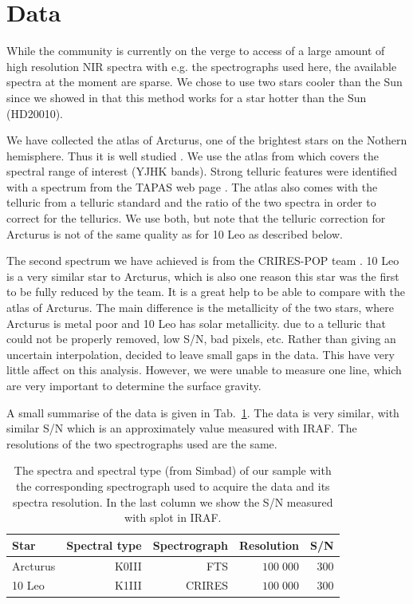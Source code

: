 \documentclass{aa}
\begin{document}
\section{Data}
\label{sec:data}

While the community is currently on the verge to access of a large amount of
high resolution NIR spectra with e.g. the spectrographs used here, the available
spectra at the moment are sparse. We chose to use two stars cooler than the Sun
since we showed in \citet{Andreasen2016} that this method works for a star
hotter than the Sun (HD20010).

We have collected the atlas of Arcturus, one of the brightest stars on the
Nothern hemisphere. Thus it is well studied
\citep[see e.g.][to mention a few]{Griffin1967,McWilliam1990,Ramirez2013}. We
use the atlas from \cite{Hinkle2003} which covers the spectral range of interest
(YJHK bands). Strong telluric features were identified with a spectrum from the
TAPAS web page \citep{Bertaux2014}. The atlas also comes with the telluric from
a telluric standard and the ratio of the two spectra in order to correct for the
tellurics. We use both, but note that the telluric correction for Arcturus is
not of the same quality as for 10 Leo as described below.

The second spectrum we have achieved is from the CRIRES-POP team
\citep{Nicholls2016}. 10 Leo is a very similar star to Arcturus, which is also
one reason this star was the first to be fully reduced by the team. It is a
great help to be able to compare with the atlas of Arcturus. The main difference
is the metallicity of the two stars, where Arcturus is metal poor and 10 Leo has
solar metallicity. due to a telluric that could not be properly removed, low
S/N, bad pixels, etc. Rather than giving an uncertain interpolation,
\citet{Nicholls2016} decided to leave small gaps in the data. This have very
little affect on this analysis. However, we were unable to measure one
 line, which are very important to determine the surface gravity.

A small summarise of the data is given in Tab.~\ref{tab:data}. The data is very
similar, with similar S/N which is an approximately value measured with IRAF.
The resolutions of the two spectrographs used are the same.


\begin{table}[htb!]
    \caption{The spectra and spectral type (from Simbad) of our sample with
             the corresponding spectrograph used to acquire the data and its
             spectra resolution. In the last column we show the S/N measured
             with splot in IRAF.}
    \label{tab:data}
    \centering
    \begin{tabular}{lrrrr}
      \hline\hline
        Star      & Spectral type & Spectrograph  & Resolution   &  S/N  \\
      \hline
        Arcturus  &      K0III    & FTS           &  $100\;000$  &  300  \\
        10 Leo    &      K1III    & CRIRES        &  $100\;000$  &  300
    \end{tabular}
\end{table}
\end{document}
